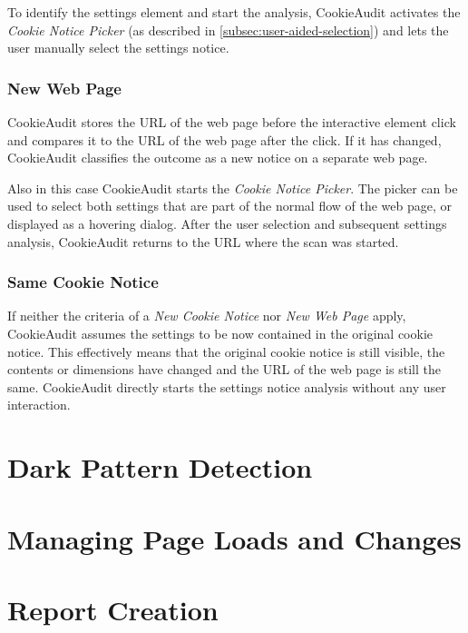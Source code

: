 To identify the settings element and start the analysis, CookieAudit activates the \emph{Cookie Notice Picker} (as described in \cref{subsec:user-aided-selection}) and lets the user manually select the settings notice.

\subsubsection{New Web Page}
CookieAudit stores the URL of the web page before the interactive element click and compares it to the URL of the web page after the click.
If it has changed, CookieAudit classifies the outcome as a new notice on a separate web page.

Also in this case CookieAudit starts the \emph{Cookie Notice Picker}. 
The picker can be used to select both settings that are part of the normal flow of the web page, or displayed as a hovering dialog.
After the user selection and subsequent settings analysis, CookieAudit returns to the URL where the scan was started.

\subsubsection{Same Cookie Notice}
If neither the criteria of a \emph{New Cookie Notice} nor \emph{New Web Page} apply, CookieAudit assumes the settings to be now contained in the original cookie notice.
This effectively means that the original cookie notice is still visible, the contents or dimensions have changed and the URL of the web page is still the same.
CookieAudit directly starts the settings notice analysis without any user interaction.

\section{Dark Pattern Detection}
\section{Managing Page Loads and Changes}
\section{Report Creation}